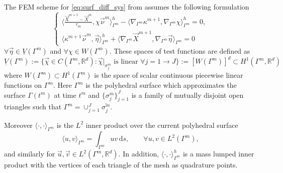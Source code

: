 \documentclass[a4paper,11pt, onecolumn]{article}
\begin{document}
\noindent The FEM scheme for \eqref{eq:surf_diff_sys} from \cite{gflows3d} assumes the following formulation
\begin{equation}\label{eq:fem_surf_diff}
 \begin{cases}
  \langle \frac{\vec{X}^{m + 1}-\vec{X}^{m}}{\tau_m},\chi\vec{\nu}^m\rangle_{\Gamma^m}^{h}-\langle\nabla_{\Gamma^m}\kappa^{m+1}, \nabla_{\Gamma^m}\chi \rangle_{\Gamma^m}^{h}=0,\\
  \langle\kappa^{m+1}\vec{\nu}^m,\vec{\eta}\rangle_{\Gamma^m}^{h}+\langle\nabla_{\Gamma^m}\vec{X}^{m + 1},\nabla_{\Gamma^m}\vec{\eta} \rangle_{\Gamma^m}=0
 \end{cases}
\end{equation}
$\forall\vec{\eta}\in\underline{V}(\Gamma^m)$ and $\forall\chi\in W(\Gamma^m)$. These spaces of test functions are defined as
\begin{equation}\label{eq:space_test_functions}
 \underline{V}(\Gamma^m):=\{\vec{\chi}\in C(\Gamma^m,\mathbb{R}^d):\vec{\chi}|_{\sigma_j^m}\textrm{ is linear }\forall j=1\rightarrow
 J\}:=[W(\Gamma^m)]^d\subset H^1(\Gamma^m,\mathbb{R}^d)
\end{equation}
where $W(\Gamma^m)\subset H^1(\Gamma^m)$ is the space of scalar continuous piecewise linear functions on $\Gamma^m$. Here $\Gamma^m$ is the polyhedral surface which approximates the surface $\Gamma (t^m)$ at time $t^m$ and  $\{\sigma_j^m\}_{j=1}^J$ is a family of mutually disjoint open triangles such that $\Gamma^m=\cup_{j=1}^J\overline{\sigma_j^m}$.
\newline

\noindent Moreover $\langle\cdot,\cdot\rangle_{\Gamma^m}$ is the $L^2$ inner product over the current polyhedral surface 
\begin{equation}\label{}
 \langle u,v\rangle_{\Gamma^m}=\int_{\Gamma^m}uv\,\mathrm{d}s,\qquad\forall u,v\in L^2(\Gamma^m),
\end{equation}
and similarly for $\vec{u},\vec{v}\in L^2(\Gamma^m,\mathbb{R}^d)$. In addition, $\langle \cdot,\cdot\rangle_{\Gamma^m}^h$ is a mass lumped inner product with the vertices of each triangle of the mesh as quadrature points.
\newline
\end{document}
